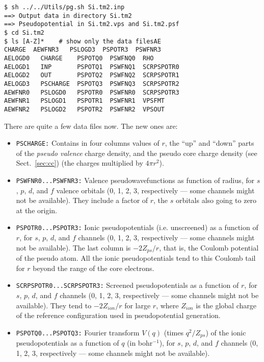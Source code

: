 \documentclass[11pt]{article}
\begin{document}
\begin{verbatim}
$ sh ../../Utils/pg.sh Si.tm2.inp
==> Output data in directory Si.tm2
==> Pseudopotential in Si.tm2.vps and Si.tm2.psf
$ cd Si.tm2
$ ls [A-Z]*    # show only the data filesAE
CHARGE  AEWFNR3   PSLOGD3  PSPOTR3  PSWFNR3     
AELOGD0   CHARGE    PSPOTQ0  PSWFNQ0  RHO         
AELOGD1   INP       PSPOTQ1  PSWFNQ1  SCRPSPOTR0  
AELOGD2   OUT       PSPOTQ2  PSWFNQ2  SCRPSPOTR1  
AELOGD3   PSCHARGE  PSPOTQ3  PSWFNQ3  SCRPSPOTR2  
AEWFNR0   PSLOGD0   PSPOTR0  PSWFNR0  SCRPSPOTR3  
AEWFNR1   PSLOGD1   PSPOTR1  PSWFNR1  VPSFMT      
AEWFNR2   PSLOGD2   PSPOTR2  PSWFNR2  VPSOUT      
\end{verbatim}

There are quite a few data files now. The new ones are:
\begin{itemize}

\item  {\tt PSCHARGE:} Contains in four
columns values of $r$, the ``up'' and ``down'' parts of the {\sl
pseudo valence} charge density, and the pseudo core charge density
(see Sect.~\ref{sec:cc}) (the charges
multiplied by $4\pi r^2$).

\item {\tt PSWFNR0...PSWFNR3:} Valence pseudowavefunctions as function
of radius, for $s$, $p$, $d$, and $f$ valence orbitals (0, 1, 2, 3,
respectively --- some channels might not be available). They include 
a factor of $r$, the $s$ orbitals also going to zero at the origin.

\item {\tt PSPOTR0...PSPOTR3:} Ionic pseudopotentials (i.e. unscreened)
as a function of $r$, for $s$, $p$, $d$, and $f$ channels (0, 1, 2, 3,
respectively --- some channels might not be available). The last
column is $-2Z_{ps}/r$, that is, the Coulomb potential of the pseudo
atom. All the ionic pseudopotentials tend to this Coulomb tail for $r$
beyond the range of the core electrons.

\item {\tt SCRPSPOTR0...SCRPSPOTR3:} Screened pseudopotentials
as a function of $r$, for $s$, $p$, $d$, and $f$ channels (0, 1, 2, 3,
respectively --- some channels might not be available). 
They tend to $-2Z_{ion}/r$ for large $r$, where $Z_{ion}$ is the
global charge of the reference configuration used in pseudopotential generation.

\item {\tt PSPOTQ0...PSPOTQ3:} Fourier transform $V(q)$ (times
$q^2/Z_{ps}$) of the ionic pseudopotentials as a function of $q$ (in
bohr$^{-1}$), for $s$, $p$, $d$, and $f$ channels (0, 1, 2, 3,
respectively --- some channels might not be available).


\end{itemize}
\end{document}
